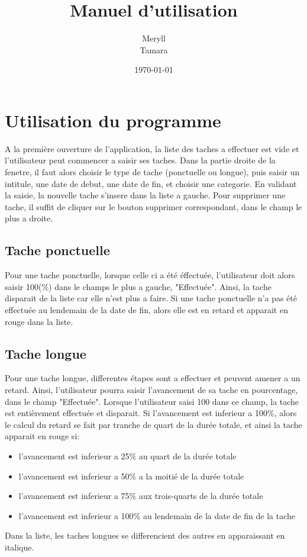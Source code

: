 \documentclass[a4paper,10pt]{article}
\author{Meryll \bsc{Essig}\\ Tamara \bsc{Rocacher}}
\date{\today}
\title{Manuel d'utilisation}
\begin{document}
\vfill
\maketitle
\vfill
\section*{Utilisation du programme}
A la première ouverture de l'application,
la liste des taches a effectuer est vide
et l'utilisateur peut commencer a saisir ses taches.
Dans la partie droite de la fenetre, il faut alors choisir le type de tache (ponctuelle ou longue), puis saisir
un intitule, une date de debut, une date de fin, et choisir une categorie. En validant la saisie, la nouvelle tache s'insere dans la liste a gauche. 
Pour supprimer une tache, il suffit de cliquer sur le bouton supprimer correspondant, dans le champ le plus a droite.
\\
\subsection*{Tache ponctuelle}
Pour une tache ponctuelle, lorsque celle ci a été éffectuée, l'utilisateur doit alors saisir 100(\%) dans le champs le plus a gauche, "Effectuée". Ainsi, la tache disparait de la liste car elle n'est plus a faire.
Si une tache ponctuelle n'a pas été effectuée au lendemain de la date de fin, alors elle est en retard et apparait en rouge dans la liste.
\\

\subsection*{Tache longue}
Pour une tache longue, differentes étapes sont a effectuer et peuvent amener a un retard. Ainsi, l'utilisateur pourra saisir l'avancement de sa tache en pourcentage, dans le champ "Effectuée".
Lorsque l'utilisateur saisi 100 dans ce champ, la tache est entièrement effectuée et disparait. Si l'avancement est inferieur a 100\%, alors le calcul du retard se fait par tranche de quart de la durée totale, et ainsi la tache apparait en rouge si:
\begin{itemize}
\item l'avancement est inferieur a 25\% au quart de la durée totale
\item l'avancement est inferieur a 50\% a la moitié de la durée totale
\item l'avancement est inferieur a 75\% aux trois-quarts de la durée totale
\item l'avancement est inferieur a 100\% au lendemain de la date de fin de la tache\\
\end{itemize}
Dans la liste, les taches longues se differencient des autres en apparaissant en italique.
\end{document}

